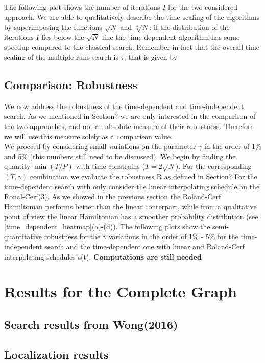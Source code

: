         The following plot shows the number of iterations $I$ for the two considered approach. We are able to qualitatively describe the time scaling of the algorithms by superimposing the functions $\sqrt{N}$ and $\sqrt[3]{N}$: if the distribution of the iterations $I$ lies below the $\sqrt{N}$ line the time-dependent algorithm has some speedup compared to the classical search. Remember in fact that the overall time scaling of the multiple runs search is $\tau$, that is given by
        

        \clearpage
    \subsection{Comparison: Robustness}
    We now address the robustness of the time-dependent and time-independent search. As we mentioned in Section? we are only interested in the comparison of the two approaches, and not an absolute measure of their robustness. Therefore we will use this measure solely as a comparison value. \\
    We proceed by considering small variations on the parameter $\gamma$ in the order of 1\% and 5\% (this numbers still need to be discussed). We begin by finding the quantity $\min(T/P)$ with time constrains ($T = 2\sqrt{N}$). For the corresponding $(T,\gamma)$ combination we evaluate the robustness R as defined in Section?
    For the time-dependent search with only consider the linear interpolating schedule an the Ronal-Cerf(3). As we showed in the previous section the Roland-Cerf Hamiltonian performs better than the linear conterpart, while from a qualitative point of view the linear Hamiltonian has a smoother probability distribution (see \cref{time_dependent_heatmap}(a)-(d)). The following plots show the semi-quantitative robustness for the $\gamma$ variations in the order of 1\% - 5\% for the time-independent search and the time-dependent one with linear and Roland-Cerf interpolating schedules s(t). \textbf{Computations are still needed}

    


\section{Results for the Complete Graph}
    \subsection{Search results from Wong(2016)}
    \subsection{Localization results}
